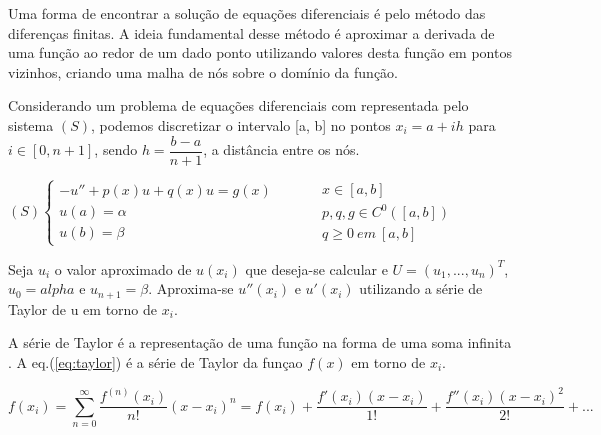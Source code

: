\par Uma forma de encontrar a solução de equações diferenciais é pelo método das diferenças finitas. A ideia fundamental desse método é aproximar a derivada de uma função ao redor de um dado ponto utilizando valores desta função em pontos vizinhos, criando uma malha de nós sobre o domínio da função.
\par Considerando um problema de equações diferenciais com  representada pelo sistema $(S)$, podemos discretizar o intervalo [a, b] no pontos $x_i = a + ih$ para $i \in [0, n+1]$, sendo $h = \dfrac{b-a}{n+1}$, a distância entre os nós.

\begin{center}
	\begin{math}
		(S)
		\left\{
    		\begin{array}{l}
      			-u'' + p(x)u + q(x)u = g(x) \\
				u(a) = \alpha\\
				u(b) = \beta      			
    		\end{array}
    		\begin{array}{l}
      		\qquad \\
			\qquad \\
			\qquad	   
    		\end{array}
    		\begin{array}{l}
      			x \in [a, b] \\
				p, q, g \in C^0([a, b])\\
				q \geq 0 \ em \ [a, b]
    		\end{array}
		\right.
	\end{math}
\end{center} 

\par Seja $u_i$ o valor aproximado de $u(x_i)$ que deseja-se calcular e $U = (u_1, ..., u_n)^T$, $u_0 = alpha$ e $u_{n+1} = \beta$. Aproxima-se $u''(x_i)$ e $u'(x_i)$ utilizando a série de Taylor de u em torno de $x_i$.
\par A série de Taylor é a representação de uma função na forma de uma soma infinita .
A eq.(\ref{eq:taylor}) é a série de Taylor da funçao $f(x)$ em torno de $x_i$.

\begin{equation} \label{eq:taylor}
f(x_i) = \sum_{n=0}^\infty \dfrac{f^{(n)}(x_i)}{n!}(x-x_i)^n = f(x_i) + \dfrac{f'(x_i)(x-x_i)}{1!} + \dfrac{f''(x_i)(x-x_i)^2}{2!} + ...
\end{equation}

